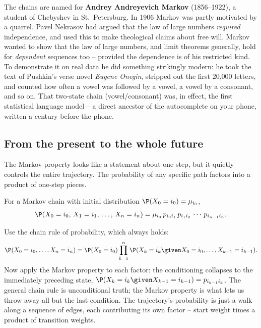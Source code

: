\begin{historybox}
The chains are named for \textbf{Andrey Andreyevich Markov} (1856--1922), a student of
Chebyshev in St.\ Petersburg. In 1906 Markov was partly motivated by a quarrel. Pavel
Nekrasov had argued that the law of large numbers \emph{required} independence, and used
this to make theological claims about free will. Markov wanted to show that the law of large
numbers, and limit theorems generally, hold for \emph{dependent} sequences too -- provided
the dependence is of his restricted kind. To demonstrate it on real data he did something
strikingly modern: he took the text of Pushkin's verse novel \emph{Eugene Onegin}, stripped
out the first 20{,}000 letters, and counted how often a vowel was followed by a vowel, a
vowel by a consonant, and so on. That two-state chain (vowel/consonant) was, in effect, the
first statistical language model -- a direct ancestor of the autocomplete on your phone,
written a century before the phone.
\end{historybox}

\subsection{From the present to the whole future}

The Markov property looks like a statement about one step, but it quietly controls the entire
trajectory. The probability of any specific path factors into a product of one-step pieces.

\begin{proposition}
\label{ch23:path-factorization}
For a Markov chain with initial distribution $\P(X_0 = i_0) = \mu_{i_0}$,
\[
  \P(X_0 = i_0,\, X_1 = i_1,\, \dots,\, X_n = i_n)
   = \mu_{i_0}\, p_{i_0 i_1}\, p_{i_1 i_2}\, \cdots\, p_{i_{n-1} i_n}.
\]
\end{proposition}

\begin{whybox}
Use the chain rule of probability, which always holds:
\[
  \P(X_0=i_0,\dots,X_n=i_n) = \P(X_0=i_0)\prod_{k=1}^{n}\P(X_k=i_k \given X_0=i_0,\dots,X_{k-1}=i_{k-1}).
\]
Now apply the Markov property to each factor: the conditioning collapses to the immediately
preceding state, $\P(X_k=i_k \given X_{k-1}=i_{k-1}) = p_{i_{k-1}i_k}$. The general chain
rule is unconditional truth; the Markov property is what lets us throw away all but the last
condition. The trajectory's probability is just a walk along a sequence of edges, each
contributing its own factor -- start weight times a product of transition weights.
\end{whybox}

